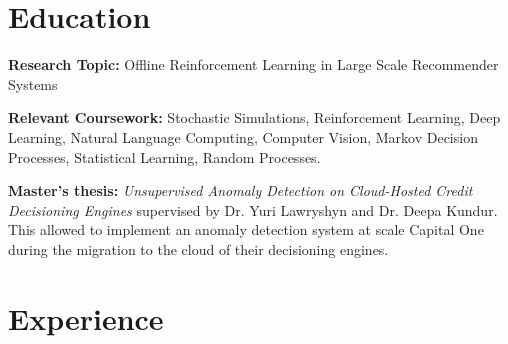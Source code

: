 \documentclass[]{deedy-resume-openfont}
\newcommand{\mybold}[1]{{\latobold\bfseries #1}}
\begin{document}
\section{Education}
\begin{tightemize}
\item \mybold{Research Topic:} Offline Reinforcement Learning in Large Scale Recommender Systems
\item \mybold{Relevant Coursework:} Stochastic Simulations, Reinforcement Learning, Deep Learning, Natural Language Computing, Computer Vision, Markov Decision Processes, Statistical Learning, Random Processes. 
\end{tightemize}

\sectionsep

\begin{tightemize}
\item \mybold{Master's thesis:} \textit{Unsupervised Anomaly Detection on Cloud-Hosted Credit Decisioning Engines} supervised by Dr. Yuri Lawryshyn and Dr. Deepa Kundur. This allowed to implement an anomaly detection system at scale Capital One during the migration to the cloud of their decisioning engines.  
\end{tightemize}

\sectionsep

\sectionsep


\section{Experience}
\end{document}
